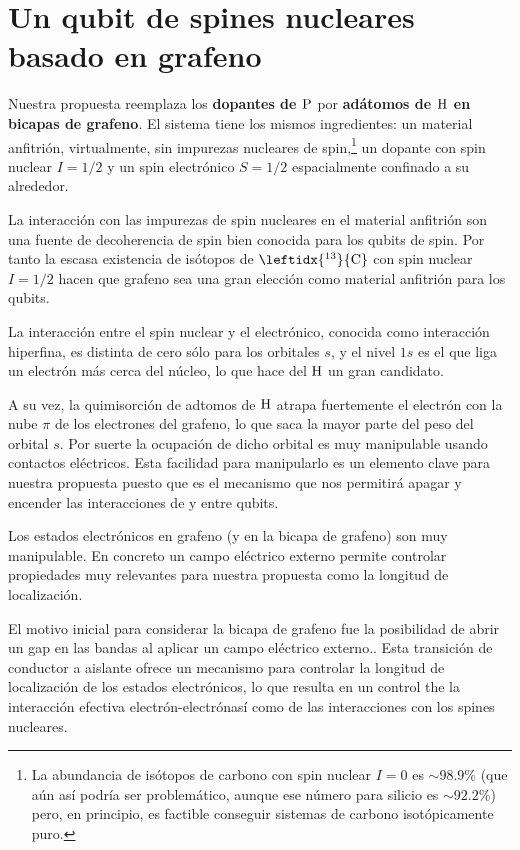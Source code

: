 \section{Un qubit de spines nucleares basado en grafeno}
Nuestra propuesta reemplaza los \textbf{dopantes de $\ce{P}$} por \textbf{adátomos de $\ce{H}$ en bicapas de grafeno}.
El sistema tiene los mismos ingredientes: un material anfitrión, virtualmente, sin impurezas nucleares de spin,\footnote{La abundancia de isótopos de carbono con spin nuclear $I=0$ es $\sim98.9\%$ (que aún así podría ser problemático, aunque ese número para silicio es $\sim92.2\%$) pero, en principio, es factible conseguir sistemas de carbono isotópicamente puro.} un dopante con spin nuclear $I=1/2$ y un spin electrónico $S=1/2$ espacialmente confinado a su alrededor.


La interacción con las impurezas de spin nucleares en el material anfitrión son una fuente de decoherencia de spin bien conocida para los qubits de spin.\cite{khaetskii2002}
Por tanto la escasa existencia de isótopos de $\leftidx{^{13}}{\ce{C}}$ con spin nuclear $I=1/2$ hacen que grafeno sea una gran elección como material anfitrión para los qubits.

La interacción entre el spin nuclear y el electrónico, conocida como interacción hiperfina, es distinta de cero sólo para los orbitales $s$, y el nivel $1s$ es el que liga un electrón más cerca del núcleo, lo que hace del $\ce{H}$ un gran candidato.

A su vez, la quimisorción  de adtomos de $\ce{H}$ atrapa fuertemente el electrón con la nube $\pi$ de los electrones del grafeno, lo que saca la mayor parte del peso del orbital $s$. Por suerte la ocupación de dicho orbital es muy manipulable usando contactos eléctricos. Esta facilidad para manipularlo es un elemento clave para nuestra propuesta puesto que es el mecanismo que nos permitirá apagar y encender las interacciones de y entre qubits.
\smallskip


Los estados electrónicos en grafeno (y en la bicapa de grafeno) son muy manipulable. En concreto un campo eléctrico externo permite controlar propiedades muy relevantes para nuestra propuesta como la longitud de localización.


El motivo inicial para considerar la bicapa de grafeno fue la posibilidad de abrir un gap en las bandas al aplicar un campo eléctrico externo.\cite{McCann2006, Castro2007, Oostinga2007, Zhang2009, Taychatanapat2010, Castro2010a, Ponomarenko2011, Allen2012, Sui2015}.
Esta transición de conductor a aislante ofrece un mecanismo para controlar la longitud de localización de los estados electrónicos, lo que resulta en un control the la interacción efectiva electrón-electrónasí como de las interacciones con los spines nucleares.


